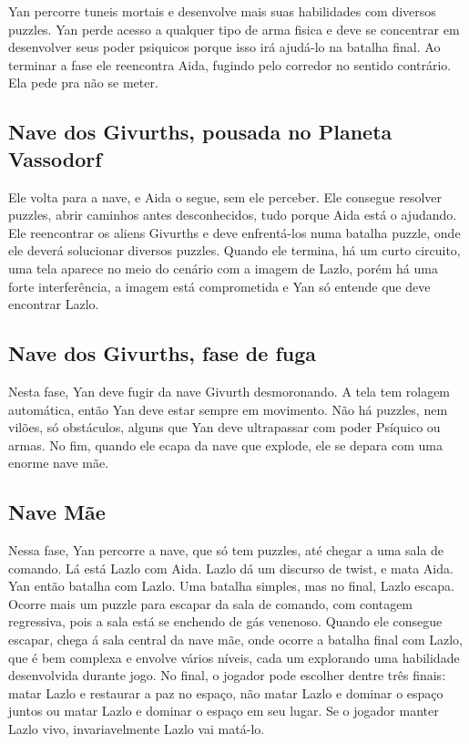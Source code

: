 \documentclass[12pt, a4paper]{article}
\begin{document}
	Yan percorre tuneis mortais e desenvolve mais suas habilidades 
    com diversos puzzles. Yan perde acesso a qualquer tipo de arma 
    fisica e deve se concentrar em desenvolver seus poder psiquicos 
    porque isso irá ajudá-lo na batalha final. Ao terminar a fase 
    ele reencontra Aida, fugindo pelo corredor no sentido contrário. 
    Ela pede pra não se meter.

	\subsection{Nave dos Givurths, pousada no Planeta Vassodorf}
	
	Ele volta para a nave, e Aida o segue, sem ele perceber. Ele 
    consegue resolver puzzles, abrir caminhos antes desconhecidos, 
    tudo porque Aida está o ajudando. Ele reencontrar os aliens Givurths 
    e deve enfrentá-los numa batalha puzzle, onde ele deverá solucionar 
    diversos puzzles. Quando ele termina, há um curto circuito, uma tela 
    aparece no meio do cenário com a imagem de Lazlo, porém há uma forte 
    interferência, a imagem está comprometida e Yan só entende que deve 
    encontrar Lazlo.

	\subsection{Nave dos Givurths, fase de fuga}

	Nesta fase, Yan deve fugir da nave Givurth desmoronando. A tela 
    tem rolagem automática, então Yan deve estar sempre em movimento. 
    Não há puzzles, nem vilões, só obstáculos, alguns que Yan deve 
    ultrapassar com poder Psíquico ou armas. No fim, quando ele ecapa 
    da nave que explode, ele se depara com uma enorme nave mãe.

	\subsection{Nave Mãe}

	Nessa fase, Yan percorre a nave, que só tem puzzles, até chegar 
    a uma sala de comando. Lá está Lazlo com Aida. Lazlo dá um discurso 
    de twist, e mata Aida. Yan então batalha com Lazlo. Uma batalha 
    simples, mas no final, Lazlo escapa. 
	Ocorre mais um puzzle para escapar da sala de comando, com 
    contagem regressiva, pois a sala está se enchendo de gás venenoso.
    Quando ele consegue escapar, chega á sala central da nave mãe, 
    onde ocorre a batalha final com Lazlo, que é bem complexa e envolve 
    vários níveis, cada um explorando uma habilidade desenvolvida 
    durante jogo. No final, o jogador pode escolher dentre três finais: 
    matar Lazlo e restaurar a paz no espaço, não matar Lazlo e dominar 
    o espaço juntos ou matar Lazlo e dominar o espaço em seu lugar. Se 
    o jogador manter Lazlo vivo, invariavelmente Lazlo vai matá-lo.
\end{document}
